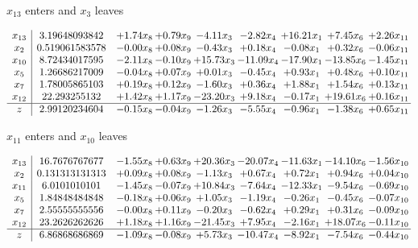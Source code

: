 \documentclass[9pt]{article}
\begin{document}
 $ x_{13} $ enters and $ x_{3} $ leaves 

 \[\begin{array}{c| c c@{\hskip 2pt} c@{\hskip 2pt} c@{\hskip 2pt} c@{\hskip 2pt} c@{\hskip 2pt} c@{\hskip 2pt} c@{\hskip 2pt} }
 x_{13}   &  3.19648093842 & +  1.74 x_{8} & +  0.79 x_{9} & -4.11 x_{3} & -2.82 x_{4} & + 16.21 x_{1} & +  7.45 x_{6} & +  2.26 x_{11}\\
 x_{2}   &  0.519061583578 & -0.00 x_{8} & +  0.08 x_{9} & -0.43 x_{3} & +  0.18 x_{4} & -0.08 x_{1} & +  0.32 x_{6} & -0.06 x_{11}\\
 x_{10}   &  8.72434017595 & -2.11 x_{8} & -0.10 x_{9} & + 15.73 x_{3} & -11.09 x_{4} & -17.90 x_{1} & -13.85 x_{6} & -1.45 x_{11}\\
 x_{5}   &  1.26686217009 & -0.04 x_{8} & +  0.07 x_{9} & +  0.01 x_{3} & -0.45 x_{4} & +  0.93 x_{1} & +  0.48 x_{6} & +  0.10 x_{11}\\
 x_{7}   &  1.78005865103 & +  0.19 x_{8} & +  0.12 x_{9} & -1.60 x_{3} & +  0.36 x_{4} & +  1.88 x_{1} & +  1.54 x_{6} & +  0.13 x_{11}\\
 x_{12}   &  22.293255132 & +  1.42 x_{8} & +  1.17 x_{9} & -23.20 x_{3} & +  9.18 x_{4} & -0.17 x_{1} & + 19.61 x_{6} & +  0.16 x_{11}\\
\hline
z    &  2.99120234604 & -0.15 x_{8} & -0.04 x_{9} & -1.26 x_{3} & -5.55 x_{4} & -0.96 x_{1} & -1.38 x_{6} & +  0.65 x_{11}\\
\end{array}\]


 $ x_{11} $ enters and $ x_{10} $ leaves 

 \[\begin{array}{c| c c@{\hskip 2pt} c@{\hskip 2pt} c@{\hskip 2pt} c@{\hskip 2pt} c@{\hskip 2pt} c@{\hskip 2pt} c@{\hskip 2pt} }
 x_{13}   &  16.7676767677 & -1.55 x_{8} & +  0.63 x_{9} & + 20.36 x_{3} & -20.07 x_{4} & -11.63 x_{1} & -14.10 x_{6} & -1.56 x_{10}\\
 x_{2}   &  0.131313131313 & +  0.09 x_{8} & +  0.08 x_{9} & -1.13 x_{3} & +  0.67 x_{4} & +  0.72 x_{1} & +  0.94 x_{6} & +  0.04 x_{10}\\
 x_{11}   &  6.0101010101 & -1.45 x_{8} & -0.07 x_{9} & + 10.84 x_{3} & -7.64 x_{4} & -12.33 x_{1} & -9.54 x_{6} & -0.69 x_{10}\\
 x_{5}   &  1.84848484848 & -0.18 x_{8} & +  0.06 x_{9} & +  1.05 x_{3} & -1.19 x_{4} & -0.26 x_{1} & -0.45 x_{6} & -0.07 x_{10}\\
 x_{7}   &  2.55555555556 & -0.00 x_{8} & +  0.11 x_{9} & -0.20 x_{3} & -0.62 x_{4} & +  0.29 x_{1} & +  0.31 x_{6} & -0.09 x_{10}\\
 x_{12}   &  23.2626262626 & +  1.18 x_{8} & +  1.16 x_{9} & -21.45 x_{3} & +  7.95 x_{4} & -2.16 x_{1} & + 18.07 x_{6} & -0.11 x_{10}\\
\hline
z    &  6.86868686869 & -1.09 x_{8} & -0.08 x_{9} & +  5.73 x_{3} & -10.47 x_{4} & -8.92 x_{1} & -7.54 x_{6} & -0.44 x_{10}\\
\end{array}\]
\end{document}

